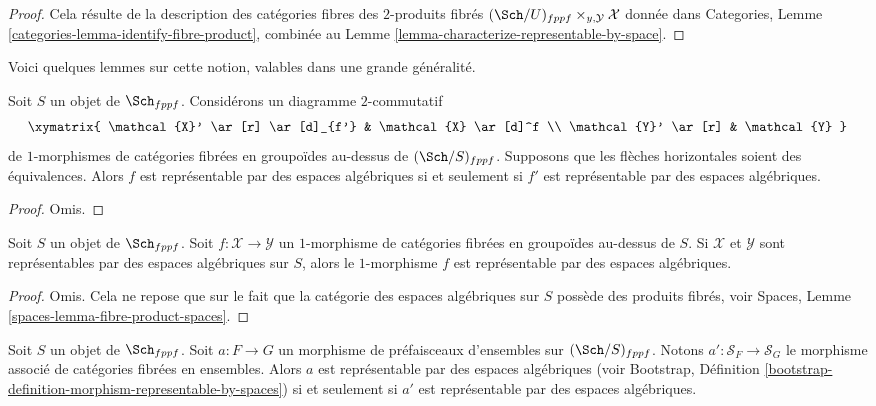 \begin{proof}
Cela résulte de la description des catégories fibres des $2$-produits fibrés
$(\Sch/U)_{fppf} \times_{y, \mathcal{Y}} \mathcal{X}$ donnée dans
Categories, Lemme \ref{categories-lemma-identify-fibre-product},
combinée au
Lemme \ref{lemma-characterize-representable-by-space}.
\end{proof}

\noindent
Voici quelques lemmes sur cette notion, valables dans une grande généralité.

\begin{lemma}
\label{lemma-representable-by-spaces-morphism-equivalent}
Soit $S$ un objet de $\Sch_{fppf}$.
Considérons un diagramme $2$-commutatif
$$
\xymatrix{
\mathcal{X}' \ar[r] \ar[d]_{f'} & \mathcal{X} \ar[d]^f \\
\mathcal{Y}' \ar[r] & \mathcal{Y}
}
$$
de $1$-morphismes de catégories fibrées en groupoïdes au-dessus de
$(\Sch/S)_{fppf}$.
Supposons que les flèches horizontales soient des équivalences.
Alors $f$ est représentable par des espaces algébriques
si et seulement si $f'$ est représentable par des espaces algébriques.
\end{lemma}

\begin{proof}
Omis.
\end{proof}

\begin{lemma}
\label{lemma-morphism-spaces-gives-representable-by-spaces}
Soit $S$ un objet de $\Sch_{fppf}$.
Soit $f : \mathcal{X} \to \mathcal{Y}$
un $1$-morphisme de catégories fibrées en groupoïdes au-dessus de $S$.
Si $\mathcal{X}$ et $\mathcal{Y}$ sont représentables par des
espaces algébriques sur $S$, alors le $1$-morphisme $f$
est représentable par des espaces algébriques.
\end{lemma}

\begin{proof}
Omis. Cela ne repose que sur le fait que
la catégorie des espaces algébriques sur $S$ possède des produits fibrés,
voir Spaces, Lemme \ref{spaces-lemma-fibre-product-spaces}.
\end{proof}

\begin{lemma}
\label{lemma-map-presheaves-representable-by-algebraic-spaces}
Soit $S$ un objet de $\Sch_{fppf}$.
Soit $a : F \to G$ un morphisme de préfaisceaux d'ensembles sur $(\Sch/S)_{fppf}$.
Notons $a' : \mathcal{S}_F  \to \mathcal{S}_G$ le morphisme associé
de catégories fibrées en ensembles.
Alors $a$ est représentable par des espaces algébriques (voir
Bootstrap,
Définition \ref{bootstrap-definition-morphism-representable-by-spaces})
si et seulement si $a'$ est représentable par des espaces algébriques.
\end{lemma}

